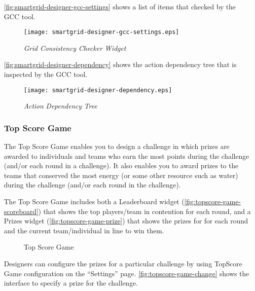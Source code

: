 \autoref{fig:smartgrid-designer-gcc-settings} shows a list of items that checked by the GCC tool. 

\begin{figure}[!ht]
  \center
  \texttt{[image: smartgrid-designer-gcc-settings.eps]}
  \caption{\em Grid Consistency Checker Widget}
  \label{fig:smartgrid-designer-gcc-settings}
\end{figure}

\autoref{fig:smartgrid-designer-dependency} shows the action dependency tree that is inspected by the GCC tool. 

 \begin{figure}[!ht]
  \center
  \texttt{[image: smartgrid-designer-dependency.eps]}
  \caption{\em Action Dependency Tree}
  \label{fig:smartgrid-designer-dependency}
\end{figure}

\clearpage

\subsubsection{Top Score Game}

The Top Score Game enables you to design a challenge in which prizes are awarded to individuals and teams who earn the most points during the challenge (and/or each round in a challenge). It also enables you to award prizes to the teams that conserved the most energy (or some other resource such as water) during the challenge (and/or each round in the challenge).

The Top Score Game includes both a Leaderboard widget (\autoref{fig:topscore-game-scoreboard}) that shows the top players/team in contention for each round, and a Prizes widget (\autoref{fig:topscore-game-prize}) that shows the prizes for for each round and the current team/individual in line to win them.

\begin{figure}[ht!]
	\centering
		\caption{Top Score Game}
		\label{fig:topscore-game}
\end{figure}

\clearpage

Designers can configure the prizes for a particular challenge by using TopScore Game configuration on the ``Settings'' page. \autoref{fig:topscore-game-change} shows the interface to specify a prize for the challenge.

